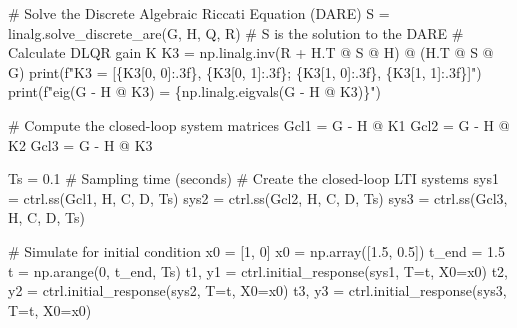 \documentclass[
  letterpaper,
  DIV=11,
  numbers=noendperiod,
  oneside]{scrartcl}
\newenvironment{Shaded}{\begin{snugshade}}{\end{snugshade}}
\newcommand{\BuiltInTok}[1]{\textcolor[rgb]{0.00,0.23,0.31}{#1}}
\newcommand{\CommentTok}[1]{\textcolor[rgb]{0.37,0.37,0.37}{#1}}
\newcommand{\DecValTok}[1]{\textcolor[rgb]{0.68,0.00,0.00}{#1}}
\newcommand{\FloatTok}[1]{\textcolor[rgb]{0.68,0.00,0.00}{#1}}
\newcommand{\NormalTok}[1]{\textcolor[rgb]{0.00,0.23,0.31}{#1}}
\newcommand{\OperatorTok}[1]{\textcolor[rgb]{0.37,0.37,0.37}{#1}}
\newcommand{\SpecialCharTok}[1]{\textcolor[rgb]{0.37,0.37,0.37}{#1}}
\newcommand{\SpecialStringTok}[1]{\textcolor[rgb]{0.13,0.47,0.30}{#1}}
\begin{document}
\begin{Shaded}
\begin{Highlighting}[numbers=left,,]
\CommentTok{\# Solve the Discrete Algebraic Riccati Equation (DARE)}
\NormalTok{S }\OperatorTok{=}\NormalTok{ linalg.solve\_discrete\_are(G, H, Q, R) }\CommentTok{\# S is the solution to the DARE}
\CommentTok{\# Calculate DLQR gain K}
\NormalTok{K3 }\OperatorTok{=}\NormalTok{ np.linalg.inv(R }\OperatorTok{+}\NormalTok{ H.T }\OperatorTok{@}\NormalTok{ S }\OperatorTok{@}\NormalTok{ H) }\OperatorTok{@}\NormalTok{ (H.T }\OperatorTok{@}\NormalTok{ S }\OperatorTok{@}\NormalTok{ G)}
\BuiltInTok{print}\NormalTok{(}\SpecialStringTok{f"K3 = [}\SpecialCharTok{\{}\NormalTok{K3[}\DecValTok{0}\NormalTok{, }\DecValTok{0}\NormalTok{]}\SpecialCharTok{:.3f\}}\SpecialStringTok{, }\SpecialCharTok{\{}\NormalTok{K3[}\DecValTok{0}\NormalTok{, }\DecValTok{1}\NormalTok{]}\SpecialCharTok{:.3f\}}\SpecialStringTok{; }\SpecialCharTok{\{}\NormalTok{K3[}\DecValTok{1}\NormalTok{, }\DecValTok{0}\NormalTok{]}\SpecialCharTok{:.3f\}}\SpecialStringTok{, }\SpecialCharTok{\{}\NormalTok{K3[}\DecValTok{1}\NormalTok{, }\DecValTok{1}\NormalTok{]}\SpecialCharTok{:.3f\}}\SpecialStringTok{]"}\NormalTok{)}
\BuiltInTok{print}\NormalTok{(}\SpecialStringTok{f"eig(G {-} H @ K3) = }\SpecialCharTok{\{}\NormalTok{np}\SpecialCharTok{.}\NormalTok{linalg}\SpecialCharTok{.}\NormalTok{eigvals(G }\OperatorTok{{-}}\NormalTok{ H }\OperatorTok{@}\NormalTok{ K3)}\SpecialCharTok{\}}\SpecialStringTok{"}\NormalTok{)}

\CommentTok{\# Compute the closed{-}loop system matrices}
\NormalTok{Gcl1 }\OperatorTok{=}\NormalTok{ G }\OperatorTok{{-}}\NormalTok{ H }\OperatorTok{@}\NormalTok{ K1 }
\NormalTok{Gcl2 }\OperatorTok{=}\NormalTok{ G }\OperatorTok{{-}}\NormalTok{ H }\OperatorTok{@}\NormalTok{ K2}
\NormalTok{Gcl3 }\OperatorTok{=}\NormalTok{ G }\OperatorTok{{-}}\NormalTok{ H }\OperatorTok{@}\NormalTok{ K3}

\NormalTok{Ts }\OperatorTok{=} \FloatTok{0.1} \CommentTok{\# Sampling time (seconds)}
\CommentTok{\# Create the closed{-}loop LTI systems}
\NormalTok{sys1 }\OperatorTok{=}\NormalTok{ ctrl.ss(Gcl1, H, C, D, Ts) }
\NormalTok{sys2 }\OperatorTok{=}\NormalTok{ ctrl.ss(Gcl2, H, C, D, Ts) }
\NormalTok{sys3 }\OperatorTok{=}\NormalTok{ ctrl.ss(Gcl3, H, C, D, Ts)}

\CommentTok{\# Simulate for initial condition x0 = [1, 0]}
\NormalTok{x0 }\OperatorTok{=}\NormalTok{ np.array([}\FloatTok{1.5}\NormalTok{, }\FloatTok{0.5}\NormalTok{])}
\NormalTok{t\_end }\OperatorTok{=} \FloatTok{1.5} 
\NormalTok{t }\OperatorTok{=}\NormalTok{ np.arange(}\DecValTok{0}\NormalTok{, t\_end, Ts) }
\NormalTok{t1, y1 }\OperatorTok{=}\NormalTok{ ctrl.initial\_response(sys1, T}\OperatorTok{=}\NormalTok{t, X0}\OperatorTok{=}\NormalTok{x0)}
\NormalTok{t2, y2 }\OperatorTok{=}\NormalTok{ ctrl.initial\_response(sys2, T}\OperatorTok{=}\NormalTok{t, X0}\OperatorTok{=}\NormalTok{x0)}
\NormalTok{t3, y3 }\OperatorTok{=}\NormalTok{ ctrl.initial\_response(sys3, T}\OperatorTok{=}\NormalTok{t, X0}\OperatorTok{=}\NormalTok{x0)}


\end{Highlighting}
\end{Shaded}
\end{document}
